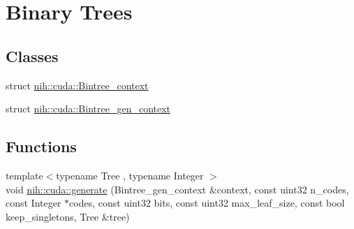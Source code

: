 \hypertarget{group__bintree}{
\section{\-Binary \-Trees}
\label{group__bintree}
}
\subsection*{\-Classes}
\begin{DoxyCompactItemize}
\item 
struct \hyperlink{structnih_1_1cuda_1_1_bintree__context}{nih\-::cuda\-::\-Bintree\-\_\-context}
\item 
struct \hyperlink{structnih_1_1cuda_1_1_bintree__gen__context}{nih\-::cuda\-::\-Bintree\-\_\-gen\-\_\-context}
\end{DoxyCompactItemize}
\subsection*{\-Functions}
\begin{DoxyCompactItemize}
\item 
{\footnotesize template$<$typename Tree , typename Integer $>$ }\\void \hyperlink{group__bintree_gad76a50ae08ab4d525f748a7cbcc0fb6e}{nih\-::cuda\-::generate} (\-Bintree\-\_\-gen\-\_\-context \&context, const uint32 n\-\_\-codes, const \-Integer $\ast$codes, const uint32 bits, const uint32 max\-\_\-leaf\-\_\-size, const bool keep\-\_\-singletons, \-Tree \&tree)
\end{DoxyCompactItemize}


